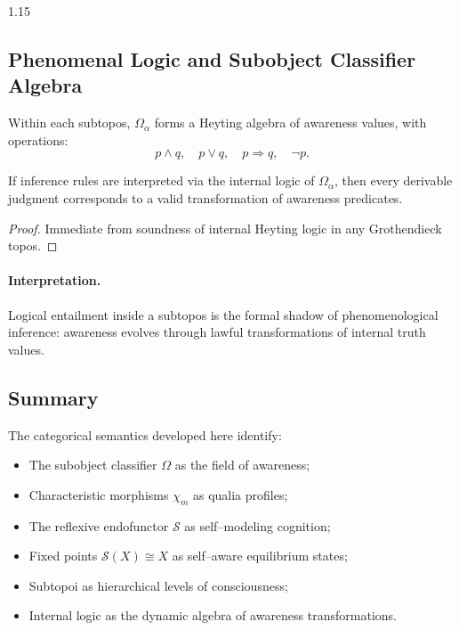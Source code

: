 \documentclass[12pt,a4paper]{article}
\begin{document}
\begin{spacing}{1.15}
\subsection{Phenomenal Logic and Subobject Classifier Algebra}

\begin{definition}
\label{def:phenoalg}
Within each subtopos,
\(\Omega_{\alpha}\)
forms a Heyting algebra of awareness values,
with operations:
\[
  p\wedge q,\quad p\vee q,\quad p\Rightarrow q,\quad \neg p.
\]
\end{definition}

\begin{theorem}
\label{thm:soundness}
If inference rules are interpreted
via the internal logic of \(\Omega_{\alpha}\),
then every derivable judgment corresponds
to a valid transformation of awareness predicates.
\end{theorem}

\begin{proof}
Immediate from soundness of internal Heyting logic
in any Grothendieck topos.
\end{proof}

\paragraph{Interpretation.}
Logical entailment inside a subtopos
is the formal shadow of phenomenological inference:
awareness evolves through lawful transformations
of internal truth values.

\subsection{Summary}

The categorical semantics developed here identify:
\begin{itemize}[leftmargin=1.2em]
  \item The subobject classifier \(\Omega\) as the field of awareness;
  \item Characteristic morphisms \(\chi_m\) as qualia profiles;
  \item The reflexive endofunctor \(\mathcal{S}\) as self–modeling cognition;
  \item Fixed points \(\mathcal{S}(X)\cong X\) as self–aware equilibrium states;
  \item Subtopoi as hierarchical levels of consciousness;
  \item Internal logic as the dynamic algebra of awareness transformations.
\end{itemize}


\end{spacing}
\end{document}

